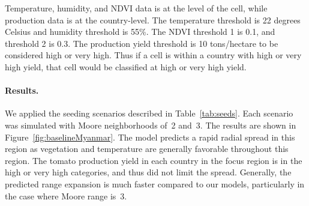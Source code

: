 \documentclass[10pt]{article}
\newcommand{\aacomment}[1]{({\color{magenta}AA: #1})}
\theoremstyle{definition}
\begin{document}
Temperature, humidity, and NDVI data is at the level of the cell, while
production data is at the country-level. The temperature threshold is 22
degrees Celsius and humidity threshold is 55\%. The NDVI threshold 1 is
0.1, and threshold 2 is 0.3. The production yield threshold is 10
tons/hectare to be considered high or very high. Thus if a cell is within a
country with high or very high yield, that cell would be classified at high
or very high yield.
\paragraph{Results.}
We applied the seeding scenarios described in Table~\ref{tab:seeds}. Each
scenario was simulated with Moore neighborhoods of~2 and~3.  The results
are shown in Figure~\ref{fig:baselineMyanmar}.  The model predicts a rapid
radial spread in this region as vegetation and temperature are generally
favorable throughout this region.  The tomato production yield in each
country in the focus region is in the high or very high categories, and
thus did not limit the spread.  Generally, the predicted range expansion is
much faster compared to our models, particularly in the case where Moore
range is~3.



\end{document}
